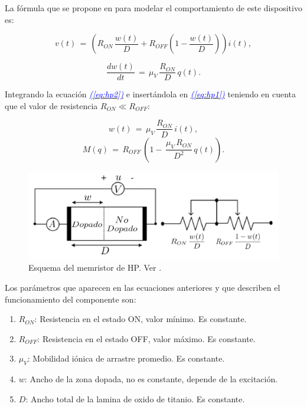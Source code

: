 \documentclass[12pt,a4paper]{report} %
\newcommand{\eref}[1]{\hyperref[#1]{\textcolor{blue}{\textit{(\ref*{#1})}}}}
\begin{document}
	La fórmula que se propone en \cite{HP} para modelar el comportamiento de este dispositivo es:
	
	\begin{equation}
		v(t)\,=\,\left(R_{ON}\,\frac{w(t)}{D}+R_{OFF}\left(1-\frac{w(t)}{D}\right)\right)i(t),
		\label{eq:hp1}
	\end{equation}
	
	\begin{equation}
		\frac{dw(t)}{dt}\,=\,\mu_V\,\frac{R_{ON}}{D}\,q(t).
		\label{eq:hp2}
	\end{equation}\smallskip
	
	Integrando la ecuación \eref{eq:hp2} e insertándola en \eref{eq:hp1} teniendo en cuenta que el valor de resistencia  $R_{ON} \ll R_{OFF}$: 
	
	\begin{equation}
		w(t)\,=\,\mu_V\,\frac{R_{ON}}{D}\,i(t),
		\label{eq:hp3}
	\end{equation}\smallskip
	\begin{equation}
		M(q)\,=\,R_{OFF}\,\left(1-\,\frac{\mu_V\,R_{ON}}{D^2}\,q(t)\right).
		\label{eq:hp4}
	\end{equation}\smallskip
	
	\begin{figure}[h]
		\centering
		\includegraphics[width=1\textwidth]{schmem.jpg}
		\caption{Esquema del memristor de HP. Ver \cite{2021}.}
		\label{fig:2021}
	\end{figure}\smallskip
	
	Los parámetros que aparecen en las ecuaciones anteriores y que describen el funcionamiento del componente son:
	
	\begin{enumerate}
		\item $R_{ON}$: Resistencia en el estado ON, valor mínimo. Es constante.
		\item $R_{OFF}$: Resistencia en el estado OFF, valor máximo. Es constante.
		\item $\mu_V$: Mobilidad iónica de arrastre promedio. Es constante.
		\item $w$: Ancho de la zona dopada, no es constante, depende de la excitación.
		\item $D$: Ancho total de la lamina de oxido de titanio. Es constante.
	\end{enumerate}
	\newpage
	
\end{document}
